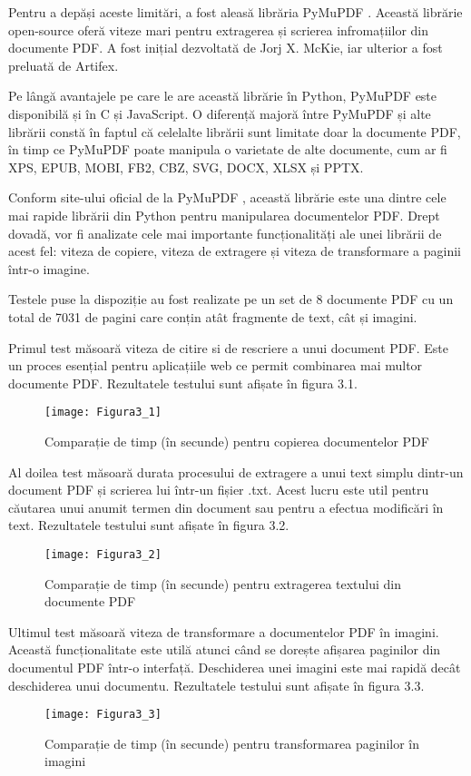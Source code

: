 Pentru a depăși aceste limitări, a fost aleasă librăria PyMuPDF \cite{pymupdf}. Această librărie open-source oferă viteze mari pentru extragerea și scrierea infromațiilor din documente PDF. A fost inițial dezvoltată de Jorj X. McKie, iar ulterior a fost preluată de Artifex.

Pe lângă avantajele pe care le are această librărie în Python, PyMuPDF este disponibilă și în C și JavaScript. O diferență majoră între PyMuPDF și alte librării constă în faptul că celelalte librării sunt limitate doar la documente PDF, în timp ce PyMuPDF poate manipula o varietate de alte documente, cum ar fi XPS, EPUB, MOBI, FB2, CBZ, SVG, DOCX, XLSX și PPTX.

Conform site-ului oficial de la PyMuPDF \cite{pymupdf}, această librărie este una dintre cele mai rapide librării din Python pentru manipularea documentelor PDF. Drept dovadă, vor fi analizate cele mai importante funcționalități ale unei librării de acest fel: viteza de copiere, viteza de extragere și viteza de transformare a paginii într-o imagine.

Testele puse la dispoziție au fost realizate pe un set de 8 documente PDF cu un total de 7031 de pagini care conțin atât fragmente de text, cât și imagini.

Primul test măsoară viteza de citire si de rescriere a unui document PDF. Este un proces esențial pentru aplicațiile web ce permit combinarea mai multor documente PDF. Rezultatele testului sunt afișate în figura 3.1.
\begin{figure}[H]
	\centering
	\texttt{[image: Figura3\_1]}
	\caption{Comparație de timp (în secunde) pentru copierea documentelor PDF}
	\label{fig:Figura3_1}
\end{figure}

Al doilea test măsoară durata procesului de extragere a unui text simplu dintr-un document PDF și scrierea lui într-un fișier .txt. Acest lucru este util pentru căutarea unui anumit termen din document sau pentru a efectua modificări în text. Rezultatele testului sunt afișate în figura 3.2.
\begin{figure}[H]
	\centering
	\texttt{[image: Figura3\_2]}
	\caption{Comparație de timp (în secunde) pentru extragerea textului din documente PDF}
	\label{fig:Figura3_2}
\end{figure}

Ultimul test măsoară viteza de transformare a documentelor PDF în imagini. Această funcționalitate este utilă atunci când se dorește afișarea paginilor din documentul PDF într-o interfață. Deschiderea unei imagini este mai rapidă decât deschiderea unui documentu. Rezultatele testului sunt afișate în figura 3.3.
\begin{figure}[H]
	\centering
	\texttt{[image: Figura3\_3]}
	\caption{Comparație de timp (în secunde) pentru transformarea paginilor în imagini}
	\label{fig:Figura3_3}
\end{figure}

